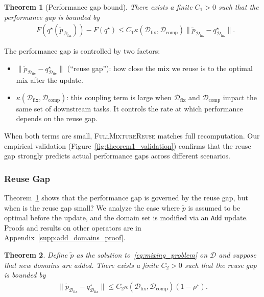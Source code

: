\documentclass[table]{ai2style/ai2}
\newtheorem{theorem}{Theorem}
\newcommand{\D}[0]{\mathcal{D}}
\newcommand{\Dfix}[0]{\mathcal{D}_{\text{fix}}}
\newcommand{\Dcomp}[0]{\mathcal{D}_{\text{comp}}}
\newcommand{\fullmixreuse}[0]{\textsc{FullMixtureReuse}\xspace}
\newcommand{\Add}[0]{\texttt{Add}\xspace}
\begin{document}
\begin{theorem}[Performance gap bound] \label{thm:general_gap} There exists a finite $C_1 > 0$ such that the performance gap is bounded by
\begin{align*} 
&F(q^\star(\tilde{p}_{\Dfix})) - F(q^\star) \le C_1 \kappa(\Dfix, \Dcomp) \|\tilde{p}_{\Dfix} - q^\star_{\Dfix}\|.
\end{align*} 
\end{theorem}

The performance gap is controlled by two factors: \begin{itemize}[itemsep=0pt,topsep=2pt,leftmargin=12pt] 
\item $\|\tilde{p}_{\Dfix} - q^\star_{\Dfix} \|$ (``reuse gap''): how close the mix we reuse is to the optimal mix after the update. 
\item $\kappa(\Dfix, \Dcomp)$: this coupling term is large when $\Dfix$ and $\Dcomp$ impact the same set of downstream tasks. It controls the rate at which performance depends on the reuse gap. 
\end{itemize}

When both terms are small, \fullmixreuse matches full recomputation. Our empirical validation (Figure~\ref{fig:theorem1_validation}) confirms that the reuse gap strongly predicts actual performance gaps across different scenarios.

\subsubsection{Reuse Gap}

Theorem~\ref{thm:general_gap} shows that the performance gap is governed by the reuse gap, but when is the reuse gap small? 
We analyze the case where $\tilde{p}$ is assumed to be optimal before the update, and the domain set is modified via an \Add update.
Proofs and results on other operators are in Appendix~\ref{supp:add_domains_proof}.

\begin{theorem}\label{thm:add_domains}
Define $\tilde{p}$ as the solution to~\eqref{eq:mixing_problem} on $\D$ and suppose that new domains are added. There exists a finite $C_2 > 0$ such that the reuse gap is bounded by
    \begin{align*}
        \|\tilde{p}_{\Dfix} - q^\star_{\Dfix}\| \le C_2 \kappa(\Dfix, \Dcomp) (1 - \rho^\star).
    \end{align*}
\end{theorem}
\end{document}
